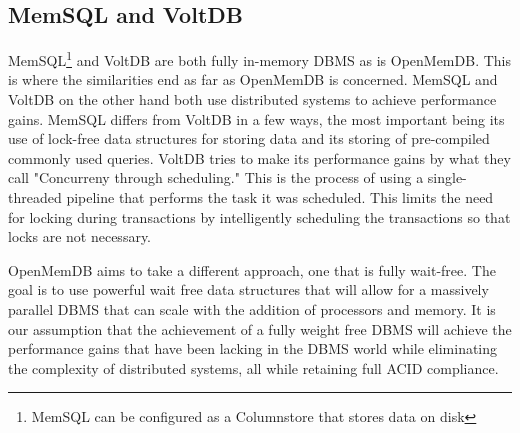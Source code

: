 \documentclass[letter,11pt]{article}
\begin{document}
\subsection{MemSQL and VoltDB}
MemSQL\footnote{MemSQL can be configured as a Columnstore that stores data on disk}
and VoltDB are both fully in-memory DBMS as is OpenMemDB. This is where the
similarities end as far as OpenMemDB is concerned. MemSQL and VoltDB on the other 
hand both use distributed systems to achieve performance gains. MemSQL differs from 
VoltDB in a few ways, the most important being its use of lock-free data structures
for storing data and its storing of pre-compiled commonly used queries\cite{MemSQL}.
VoltDB tries to make its performance gains by what they call "Concurreny through
scheduling."\cite{VoltDB} This is the process of using a single-threaded pipeline 
that performs the task it was scheduled. This limits the need for locking during
transactions by intelligently scheduling the transactions so that locks are not
necessary.
\par\vspace{\baselineskip}
OpenMemDB aims to take a different approach, one that is fully wait-free. The goal is 
to use powerful wait free data structures that will allow for a massively parallel 
DBMS that can scale with the addition of processors and memory. It is our assumption 
that the achievement of a fully weight free DBMS will achieve the performance gains 
that have been lacking in the DBMS world while eliminating the complexity of 
distributed systems, all while retaining full ACID compliance.
\newpage
\end{document}
